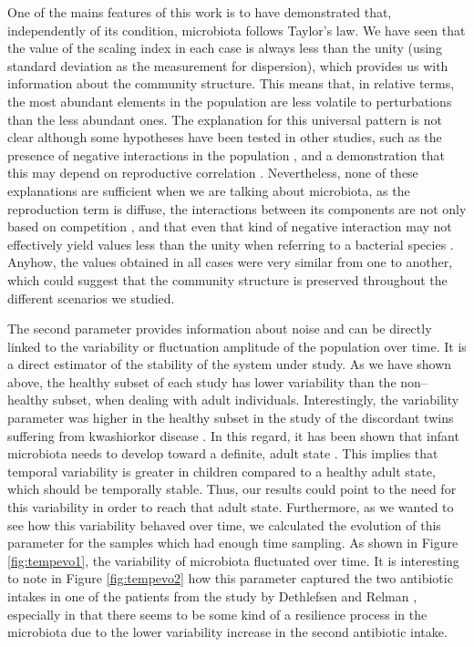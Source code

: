 One of the mains features of this work is to have demonstrated that, independently of its condition, microbiota follows Taylor's law. We have seen that the value of the scaling index in each case is always less than the unity (using standard deviation as the measurement for dispersion), which provides us with information about the community structure. This means that, in relative terms, the most abundant elements in the population are less volatile to perturbations than the less abundant ones. The explanation for this universal pattern is not clear although some hypotheses have been tested in other studies, such as the presence of negative interactions in the population \cite{kilpatrick}, and a demonstration that this may depend on reproductive correlation \cite{ballantyne}. Nevertheless, none of these explanations are sufficient when we are talking about microbiota, as the reproduction term is diffuse, the interactions between its components are not only based on competition \cite{joao, mehta, bucci}, and that even that kind of negative interaction may not effectively yield values less than the unity when referring to a bacterial species \cite{ramslayer}. Anyhow, the values obtained in all cases were very similar from one to another, which could suggest that the community structure is preserved throughout the different scenarios we studied.

The second parameter provides information about noise and can be directly linked to the variability or fluctuation amplitude of the population over time. It is a direct estimator of the stability of the system under study. As we have shown above, the healthy subset of each study has lower variability than the non--healthy subset, when dealing with adult individuals. Interestingly, the variability parameter was higher in the healthy subset in the study of the discordant twins suffering from kwashiorkor disease \cite{kwashiorkor}. In this regard, it has been shown that infant microbiota needs to develop toward a definite, adult state \cite{koenig}. This implies that temporal variability is greater in children compared to a healthy adult state, which should be temporally stable. Thus, our results could point to the need for this variability in order to reach that adult state. Furthermore, as we wanted to see how this variability behaved over time, we calculated the evolution of this parameter for the samples which had enough time sampling. As shown in Figure \ref{fig:tempevo1}, the variability of microbiota fluctuated over time. It is interesting to note in Figure \ref{fig:tempevo2} how this parameter captured the two antibiotic intakes in one of the patients from the study by Dethlefsen and Relman \cite{antibiotic}, especially in that there seems to be some kind of a resilience process in the microbiota due to the lower variability increase in the second antibiotic intake.  

